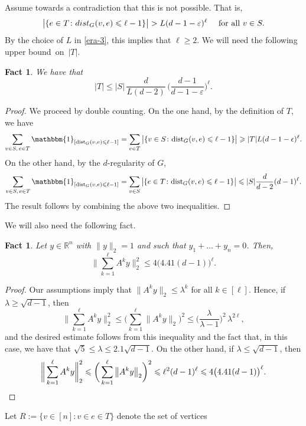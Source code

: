 \documentclass[11pt,leqno]{amsart}
\newtheorem{fact}[theorem]{Fact}
\theoremstyle{remark}
\theoremstyle{plain}
\def\dist{{\rm dist}}
\def\dist{{\rm dist}}
\newcommand{\eps}{\epsilon}
\begin{document}
Assume towards a contradiction that this is not possible. That is,
\begin{equation} \label{con-part-b}
\big|\{e\in T\colon \dist_G(v,e)\leqslant \ell-1\}\big|> L(d-1-\varepsilon)^\ell \ \ \ \text{ for all } v\in S.
\end{equation}
By the choice of $L$ in \eqref{era-3}, this implies that $\ell\geqslant 2$.
We will need the following upper bound~on~$|T|$.
\begin{fact} \label{f1-part-b}
We have that
\[ |T| \leqslant |S|\, \frac{d}{L(d-2)}\, \Big( \frac{d-1}{d-1-\varepsilon}\Big)^\ell. \]
\end{fact}
\begin{proof}
We proceed by double counting. On the one hand, by the definition of $T$, we have
\[ \sum_{v \in S,\, e \in T} \mathbbm{1}_{[\mathrm{dist}_G(v,e) \leqslant \ell-1]} =
\sum_{e \in T} \big|\{v \in S\colon \mathrm{dist}_G(v, e) \leqslant \ell-1 \}\big|
\geqslant |T|L(d-1-\eps)^\ell.  \]
On the other hand, by the $d$-regularity of $G$,
\[ \sum_{v \in S,\, e \in T}\mathbbm{1}_{[\mathrm{dist}_G(v,e) \leqslant \ell-1]} =
\sum_{v \in S} \big|\{e \in T\colon \mathrm{dist}_G(v, e) \leqslant \ell-1 \}\big|
\leqslant  |S| \frac{d}{d-2} (d-1)^\ell. \]
The result follows by combining the above two inequalities.
\end{proof}
We will also need the following fact.
\begin{fact} \label{f2-part-b}
Let $y\in\mathbb{R}^n$ with $\|y\|_2=1$ and such that $y_1+\dots+y_n=0$. Then,
\[ \bigg\|\sum_{k = 1}^{\ell} A^k y \bigg\|_2^2 \leqslant
4 \big( 4.41(d-1)\big)^\ell. \]
\end{fact}
\begin{proof}
Our assumptions imply that $\big\|A^ky\big\|_2 \leqslant \lambda^k$ for all $k\in [\ell]$. Hence,
if $\lambda\geqslant \sqrt{d-1}$, then
\[ \bigg\|\sum_{k = 1}^{\ell} A^k y \bigg\|_2^2 \leqslant
\bigg(\sum_{k = 1}^{\ell} \big\| A^k y \big\|_2\bigg)^2 \leqslant
\Big(\frac{\lambda}{\lambda-1}\Big)^2\, \lambda^{2\ell}, \]
and the desired estimate follows from this inequality and the fact that, in this case, we have that
$\sqrt{5}\leqslant \lambda \leqslant 2.1\sqrt{d-1}$. On the other hand, if $\lambda\leqslant \sqrt{d-1}$, then
\[ \bigg\|\sum_{k = 1}^{\ell} A^k y \bigg\|_2^2 \leqslant
\bigg(\sum_{k = 1}^{\ell} \big\| A^k y \big\|_2\bigg)^2 \leqslant
\ell^2 (d-1)^{\ell} \leqslant 4 \big( 4.41(d-1)\big)^\ell. \qedhere\]
\end{proof}
Let $R:=\big\{ v\in [n]\colon v\in e\in T\big\}$ denote the set of vertices
\end{document}
